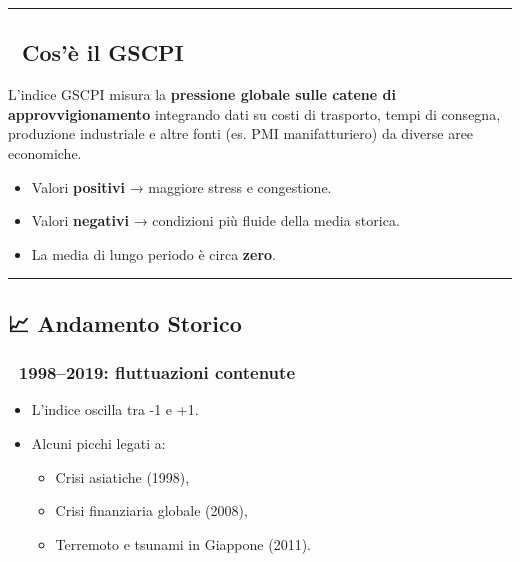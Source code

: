 \documentclass[
  11pt,
  letterpaper,
  DIV=11,
  numbers=noendperiod]{scrartcl}
\providecommand{\tightlist}{%
  \setlength{\itemsep}{0pt}\setlength{\parskip}{0pt}}
\begin{document}
\begin{center}\rule{0.5\linewidth}{0.5pt}\end{center}

\subsection{\texorpdfstring{🧭 \textbf{Cos'è il
GSCPI}}{🧭 Cos'è il GSCPI}}\label{cosuxe8-il-gscpi}

L'indice GSCPI misura la \textbf{pressione globale sulle catene di
approvvigionamento} integrando dati su costi di trasporto, tempi di
consegna, produzione industriale e altre fonti (es. PMI manifatturiero)
da diverse aree economiche.

\begin{itemize}
\tightlist
\item
  Valori \textbf{positivi} → maggiore stress e congestione.
\item
  Valori \textbf{negativi} → condizioni più fluide della media storica.
\item
  La media di lungo periodo è circa \textbf{zero}.
\end{itemize}

\begin{center}\rule{0.5\linewidth}{0.5pt}\end{center}

\subsection{\texorpdfstring{📈 \textbf{Andamento
Storico}}{📈 Andamento Storico}}\label{andamento-storico}

\subsubsection{\texorpdfstring{🔹 \textbf{1998--2019: fluttuazioni
contenute}}{🔹 1998--2019: fluttuazioni contenute}}\label{fluttuazioni-contenute}

\begin{itemize}
\item
  L'indice oscilla tra -1 e +1.
\item
  Alcuni picchi legati a:

  \begin{itemize}
  \tightlist
  \item
    Crisi asiatiche (1998),
  \item
    Crisi finanziaria globale (2008),
  \item
    Terremoto e tsunami in Giappone (2011).
  \end{itemize}
\end{itemize}
\end{document}
